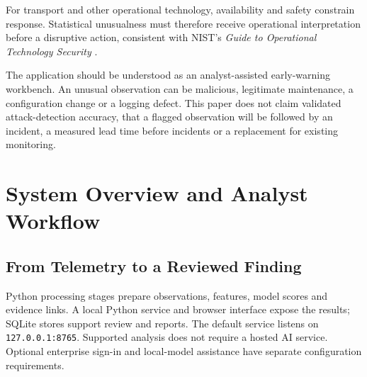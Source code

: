 \documentclass[11pt,a4paper]{article}
\begin{document}
For transport and other operational technology, availability and safety constrain response. Statistical unusualness must therefore receive operational interpretation before a disruptive action, consistent with NIST's \emph{Guide to Operational Technology Security} \cite{ref1}.

The application should be understood as an analyst-assisted early-warning workbench. An unusual observation can be malicious, legitimate maintenance, a configuration change or a logging defect. This paper does not claim validated attack-detection accuracy, that a flagged observation will be followed by an incident, a measured lead time before incidents or a replacement for existing monitoring.

\clearpage
\section{System Overview and Analyst Workflow}

\subsection{From Telemetry to a Reviewed Finding}

Python processing stages prepare observations, features, model scores and evidence links. A local Python service and browser interface expose the results; SQLite stores support review and reports. The default service listens on \nolinkurl{127.0.0.1:8765}. Supported analysis does not require a hosted AI service. Optional enterprise sign-in and local-model assistance have separate configuration requirements.
\end{document}
